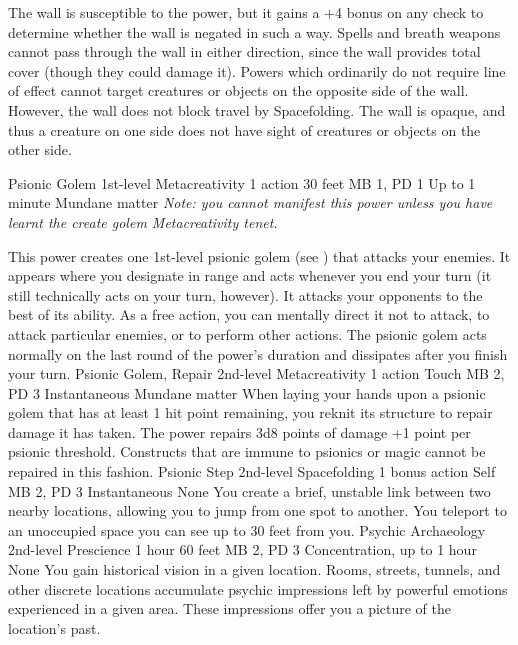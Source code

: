 The wall is susceptible to the  power,
but it gains a +4 bonus on any check to determine whether
the wall is negated in such a way. Spells and breath weapons
cannot pass through the wall in either direction, since the
wall provides total cover (though they could damage it). Powers
which ordinarily do not require line of effect cannot target
creatures or objects on the opposite side of the wall. However,
the wall does not block travel by Spacefolding. The wall is
opaque, and thus a creature on one side does not have sight
of creatures or objects on the other side.

\DndPowerHeader%
    {Psionic Golem\label{pwr:psionic_golem}}
    {1st-level Metacreativity}
    {1 action}
    {30 feet}
    {MB 1, PD 1}
    {Up to 1 minute}
    {Mundane matter}
\textit{Note: you cannot manifest this power
unless you have learnt the create golem Metacreativity tenet.}

This power creates one 1st-level psionic golem
(see )
that attacks your enemies. It appears where you designate
in range and acts whenever you end your turn (it still technically
acts on your turn, however). It attacks your opponents to
the best of its ability. As a free action, you can mentally
direct it not to attack, to attack particular enemies, or
to perform other actions. The psionic golem acts normally
on the last round of the power's duration and dissipates
after you finish your turn.
\DndPowerHeader%
    {Psionic Golem, Repair\label{pwr:psionic_golem_repair}}
    {2nd-level Metacreativity}
    {1 action}
    {Touch}
    {MB 2, PD 3}
    {Instantaneous}
    {Mundane matter}
When laying your hands upon a psionic golem
that has at least 1 hit point remaining, you reknit its structure
to repair damage it has taken. The power repairs 3d8 points
of damage +1 point per psionic threshold. Constructs that
are immune to psionics or magic cannot be repaired in this
fashion.
\DndPowerHeader%
    {Psionic Step\label{pwr:psionic_step}}
    {2nd-level Spacefolding}
    {1 bonus action}
    {Self}
    {MB 2, PD 3}
    {Instantaneous}
    {None}
You create a brief, unstable link between
two nearby locations, allowing you to jump from one spot to
another. You teleport to an unoccupied space you can see up
to 30 feet from you.
\DndPowerHeader%
    {Psychic Archaeology\label{pwr:psychic_archaeology}}
    {2nd-level Prescience}
    {1 hour}
    {60 feet}
    {MB 2, PD 3}
    {Concentration, up to 1 hour}
    {None}
You gain historical vision in a given location.
Rooms, streets, tunnels, and other discrete locations accumulate
psychic impressions left by powerful emotions experienced
in a given area. These impressions offer you a picture of
the location's past.

